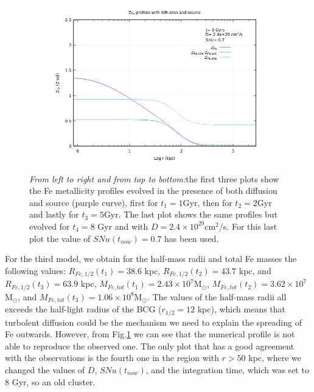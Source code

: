 \documentclass{article}
\begin{document}
\begin{figure}[H]
\begin{subfigure}{0.49\textwidth}
	\end{subfigure}
	\begin{subfigure}{0.49\textwidth}
		\includegraphics[width=0.9\linewidth]{Z_diffsource_8.png}
	\end{subfigure}
	\caption{\textit{From left to right and from top to bottom:}the first three plots show the Fe metallicity profiles evolved in the presence of both diffusion and source (purple curve), first for $t_{1}=1$Gyr, then for $t_{2}=2$Gyr and lastly for $t_{3}=5$Gyr. The last plot shows the same profiles but evolved for $t_{4}=8$ Gyr and with $D=2.4\times 10^{29}$cm$^{2}$/s. For this last plot the value of $SNu(t_{now})=0.7$ has been used.}
	\label{fig:Zdiffsource}
\end{figure}
For the third model, we obtain for the half-mass radii and total Fe masses the following values: $R_{Fe,1/2}(t_{1})=38.6$ kpc, $R_{Fe,1/2}(t_{2})=43.7$ kpc, and $R_{Fe,1/2}(t_{3})=63.9$ kpc,
$M_{Fe,tot}(t_{1})=2.43\times10^{7}$M$_{\odot}$, $M_{Fe,tot}(t_{2})=3.62\times10^{7}$M$_{\odot}$, and $M_{Fe,tot}(t_{3})=1.06\times10^{8}$M$_{\odot}$.
The values of the half-mass radii all exceeds the half-light radius of the BCG ($r_{1/2}=12$ kpc), which means that turbolent diffusion could be the mechanism we need to explain the spreading of Fe outwards. However, from Fig.\ref{fig:Zdiffsource} we can see that the numerical profile is not able to reproduce the observed one. The only plot that has a good agreement with the observations is the fourth one in the region with $r>50$ kpc, where we changed the values of $D$, $SNu(t_{now})$, and the integration time, which was set to $8$ Gyr, so an old cluster.
\end{document}
